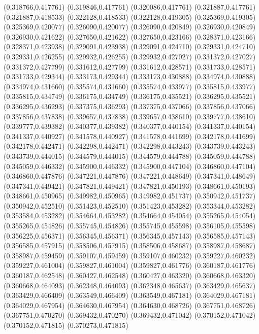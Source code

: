 (0.318766,0.417761)
(0.319846,0.417761)
(0.320086,0.417761)
(0.321887,0.417761)
(0.321887,0.418533)
(0.322128,0.418533)
(0.322128,0.419305)
(0.325369,0.419305)
(0.325369,0.420077)
(0.326090,0.420077)
(0.326090,0.420849)
(0.326930,0.420849)
(0.326930,0.421622)
(0.327650,0.421622)
(0.327650,0.423166)
(0.328371,0.423166)
(0.328371,0.423938)
(0.329091,0.423938)
(0.329091,0.424710)
(0.329331,0.424710)
(0.329331,0.426255)
(0.329932,0.426255)
(0.329932,0.427027)
(0.331372,0.427027)
(0.331372,0.427799)
(0.331612,0.427799)
(0.331612,0.428571)
(0.331733,0.428571)
(0.331733,0.429344)
(0.333173,0.429344)
(0.333173,0.430888)
(0.334974,0.430888)
(0.334974,0.431660)
(0.335574,0.431660)
(0.335574,0.433977)
(0.335815,0.433977)
(0.335815,0.434749)
(0.336175,0.434749)
(0.336175,0.435521)
(0.336295,0.435521)
(0.336295,0.436293)
(0.337375,0.436293)
(0.337375,0.437066)
(0.337856,0.437066)
(0.337856,0.437838)
(0.339657,0.437838)
(0.339657,0.438610)
(0.339777,0.438610)
(0.339777,0.439382)
(0.340377,0.439382)
(0.340377,0.440154)
(0.341337,0.440154)
(0.341337,0.440927)
(0.341578,0.440927)
(0.341578,0.441699)
(0.342178,0.441699)
(0.342178,0.442471)
(0.342298,0.442471)
(0.342298,0.443243)
(0.343739,0.443243)
(0.343739,0.444015)
(0.344579,0.444015)
(0.344579,0.444788)
(0.345059,0.444788)
(0.345059,0.446332)
(0.345900,0.446332)
(0.345900,0.447104)
(0.346860,0.447104)
(0.346860,0.447876)
(0.347221,0.447876)
(0.347221,0.448649)
(0.347341,0.448649)
(0.347341,0.449421)
(0.347821,0.449421)
(0.347821,0.450193)
(0.348661,0.450193)
(0.348661,0.450965)
(0.349982,0.450965)
(0.349982,0.451737)
(0.350942,0.451737)
(0.350942,0.452510)
(0.351423,0.452510)
(0.351423,0.453282)
(0.353344,0.453282)
(0.353584,0.453282)
(0.354664,0.453282)
(0.354664,0.454054)
(0.355265,0.454054)
(0.355265,0.454826)
(0.355745,0.454826)
(0.355745,0.455598)
(0.356105,0.455598)
(0.356225,0.456371)
(0.356345,0.456371)
(0.356345,0.457143)
(0.356585,0.457143)
(0.356585,0.457915)
(0.358506,0.457915)
(0.358506,0.458687)
(0.358987,0.458687)
(0.358987,0.459459)
(0.359107,0.459459)
(0.359107,0.460232)
(0.359227,0.460232)
(0.359227,0.461004)
(0.359827,0.461004)
(0.359827,0.461776)
(0.360187,0.461776)
(0.360187,0.462548)
(0.360427,0.462548)
(0.360427,0.463320)
(0.360668,0.463320)
(0.360668,0.464093)
(0.362348,0.464093)
(0.362348,0.465637)
(0.363429,0.465637)
(0.363429,0.466409)
(0.363549,0.466409)
(0.363549,0.467181)
(0.364029,0.467181)
(0.364029,0.467954)
(0.364630,0.467954)
(0.364630,0.468726)
(0.367751,0.468726)
(0.367751,0.470270)
(0.369432,0.470270)
(0.369432,0.471042)
(0.370152,0.471042)
(0.370152,0.471815)
(0.370273,0.471815)
